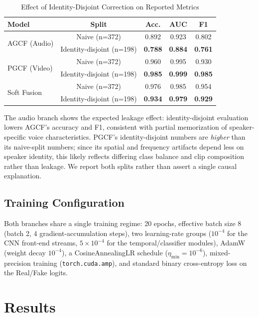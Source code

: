\documentclass[conference]{IEEEtran}
\begin{document}
\begin{table}[t]
\caption{Effect of Identity-Disjoint Correction on Reported Metrics}
\label{tab:leakage}
\centering
\small
\begin{tabular}{lcccc}
\toprule
\textbf{Model} & \textbf{Split} & \textbf{Acc.} & \textbf{AUC} & \textbf{F1} \\
\midrule
\multirow{2}{*}{AGCF (Audio)} & Naive (n=372) & 0.892 & 0.923 & 0.802 \\
& Identity-disjoint (n=198) & \textbf{0.788} & \textbf{0.884} & \textbf{0.761} \\
\midrule
\multirow{2}{*}{PGCF (Video)} & Naive (n=372) & 0.960 & 0.995 & 0.930 \\
& Identity-disjoint (n=198) & \textbf{0.985} & \textbf{0.999} & \textbf{0.985} \\
\midrule
\multirow{2}{*}{Soft Fusion} & Naive (n=372) & 0.976 & 0.985 & 0.954 \\
& Identity-disjoint (n=198) & \textbf{0.934} & \textbf{0.979} & \textbf{0.929} \\
\bottomrule
\end{tabular}
\end{table}

The audio branch shows the expected leakage effect: identity-disjoint evaluation lowers AGCF's accuracy and F1, consistent with partial memorization of speaker-specific voice characteristics. PGCF's identity-disjoint numbers are \emph{higher} than its naive-split numbers; since its spatial and frequency artifacts depend less on speaker identity, this likely reflects differing class balance and clip composition rather than leakage. We report both splits rather than assert a single causal explanation.

\subsection{Training Configuration}
Both branches share a single training regime: 20 epochs, effective batch size 8 (batch 2, 4 gradient-accumulation steps), two learning-rate groups ($10^{-4}$ for the CNN front-end streams, $5\times10^{-4}$ for the temporal/classifier modules), AdamW (weight decay $10^{-4}$), a CosineAnnealingLR schedule ($\eta_{\min}=10^{-6}$), mixed-precision training (\texttt{torch.cuda.amp}), and standard binary cross-entropy loss on the Real/Fake logits.

\section{Results}
\end{document}
